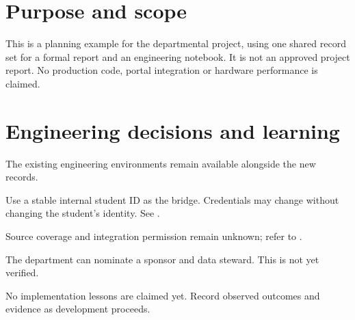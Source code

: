 \OTMakeProjectTitle
\section*{Purpose and scope}
This is a planning example for the departmental project, using one shared record set
for a formal report and an engineering notebook. It is not an approved project report.
No production code, portal integration or hardware performance is claimed.
\section*{Engineering decisions and learning}
The existing engineering environments remain available alongside the new records.
\begin{decision}
\label{decision:identity}
Use a stable internal student ID as the bridge. Credentials may change without
changing the student's identity. See .
\end{decision}
\begin{risk}
Source coverage and integration permission remain unknown; refer to .
\end{risk}
\begin{assumption}
The department can nominate a sponsor and data steward. This is not yet verified.
\end{assumption}
\begin{lesson}
No implementation lessons are claimed yet. Record observed outcomes and evidence
as development proceeds.
\end{lesson}
\OTPrintSignoffs

